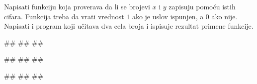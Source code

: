\begin{Exercise}[label=p1.4_12] 
Napisati funkciju  koja proverava da li
se brojevi $x$ i $y$ zapisuju pomoću istih cifara. Funkcija treba da
vrati vrednost $1$ ako je uslov ispunjen, a $0$ ako nije. Napisati i
program koji učitava dva cela broja i ispisuje rezultat primene
funkcije.
 
\begin{miditest}
\begin{upotreba}{1}
#\naslovInt#
##
##
\end{upotreba}
\end{miditest}
\begin{miditest}
\begin{upotreba}{2}
#\naslovInt#
##
##
\end{upotreba}
\end{miditest}

\begin{miditest}
\begin{upotreba}{3}
#\naslovInt#
##
##
\end{upotreba}
\end{miditest} 

\end{Exercise}
\begin{Answer}[ref=p1.4_12]
\end{Answer}


